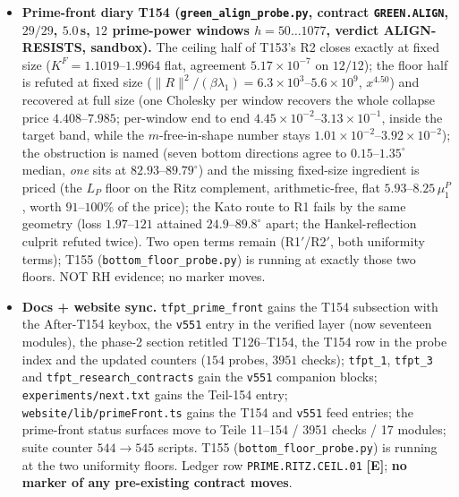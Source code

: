 \documentclass[11pt]{article}
\providecommand{\mE}{\textbf{[E]}}\providecommand{\mC}{\textbf{[C]}}
\begin{document}
\begin{itemize}[leftmargin=1.5em]
the Courant--Fischer direction is violated nowhere ($16/16$ positive-definite cases); the
Dirichlet control (the Hankel half removed, arithmetic kept bit for bit) stops being positive
definite --- $\lambda_1=-5.60\ldots-3.55$ certified on $3/3$ --- so no ceiling exists there:
the reflection half is load-bearing for positivity.
\item \textbf{Prime-front diary T154 (\texttt{green\_align\_probe.py}, contract
\texttt{GREEN.ALIGN}, $29/29$, $5.0$\,s, $12$ prime-power windows $h=50\ldots1077$, verdict
ALIGN-RESISTS, sandbox).} The ceiling half of T153's R2 closes exactly at fixed size
($K^F=1.1019$--$1.9964$ flat, agreement $5.17\times10^{-7}$ on $12/12$); the floor half is
refuted at fixed size ($\|R\|^2/(\beta\lambda_1)=6.3\times10^{3}$--$5.6\times10^{9}$,
$x^{4.50}$) and recovered at full size (one Cholesky per window recovers the whole collapse
price $4.408$--$7.985$; per-window end to end $4.45\times10^{-2}$--$3.13\times10^{-1}$, inside
the target band, while the $m$-free-in-shape number stays
$1.01\times10^{-2}$--$3.92\times10^{-2}$); the obstruction is named (seven bottom directions
agree to $0.15$--$1.35^\circ$ median, \emph{one} sits at $82.93$--$89.79^\circ$) and the
missing fixed-size ingredient is priced (the $L_P$ floor on the Ritz complement,
arithmetic-free, flat $5.93$--$8.25\,\mu^P_1$, worth $91$--$100\%$ of the price); the Kato
route to R1 fails by the same geometry (loss $1.97$--$121$ attained $24.9$--$89.8^\circ$
apart; the Hankel-reflection culprit refuted twice). Two open terms remain (R1$'$/R2$'$, both
uniformity terms); T155 (\texttt{bottom\_floor\_probe.py}) is running at exactly those two
floors. NOT RH evidence; no marker moves.
\item \textbf{Docs + website sync.} \texttt{tfpt\_prime\_front} gains the T154 subsection with
the After-T154 keybox, the \texttt{v551} entry in the verified layer (now seventeen modules),
the phase-2 section retitled T126--T154, the T154 row in the probe index and the updated
counters ($154$ probes, $3951$ checks); \texttt{tfpt\_1}, \texttt{tfpt\_3} and
\texttt{tfpt\_research\_contracts} gain the \texttt{v551} companion blocks;
\texttt{experiments/next.txt} gains the Teil-154 entry;
\texttt{website/lib/primeFront.ts} gains the T154 and \texttt{v551} feed entries; the
prime-front status surfaces move to Teile 11--154 / 3951 checks / 17 modules; suite counter
$544\to545$ scripts. T155 (\texttt{bottom\_floor\_probe.py}) is running at the two uniformity
floors. Ledger row \texttt{PRIME.RITZ.CEIL.01} \mE; \textbf{no marker of any pre-existing
contract moves}.
\end{itemize}
\end{document}
